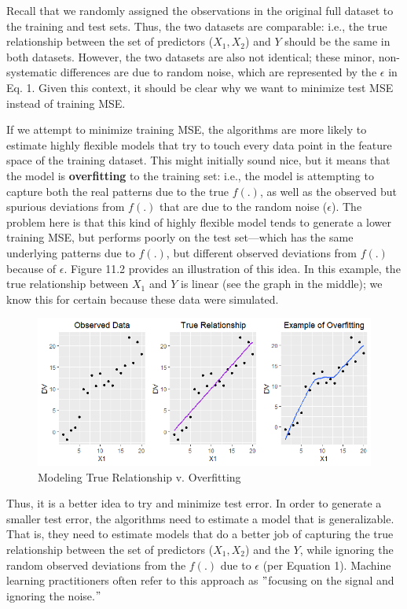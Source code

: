 \documentclass{book}
\begin{document}
Recall that we randomly assigned the observations in the original full dataset
to the training and test sets. Thus, the two datasets are comparable: i.e.,
the true relationship between the set of predictors (\(X_{1}, X_{2}\)) and
\(Y\) should be the same in both datasets. However, the two datasets are also
not identical; these minor, non-systematic differences are due to random
noise, which are represented by the \(\epsilon\) in Eq. 1. Given this context,
it should be clear why we want to minimize test MSE instead of training MSE.

If we attempt to minimize training MSE, the algorithms are more likely to
estimate highly flexible models that try to touch every data point in the
feature space of the training dataset. This might initially sound nice, but it
means that the model is \textbf{overfitting} to the training set: i.e., the
model is attempting to capture both the real patterns due to the true
\({f}(.)\), as well as the observed but spurious deviations from \({f}(.)\)
that are due to the random noise (\(\epsilon\)). The problem here is that this
kind of highly flexible model tends to generate a lower training MSE, but
performs poorly on the test set---which has the same underlying patterns due
to \({f}(.)\), but different observed deviations from \({f}(.)\) because of
\(\epsilon\). Figure 11.2 provides an illustration of this idea. In this
example, the true relationship between \(X_{1}\) and \(Y\) is linear (see the
graph in the middle); we know this for certain because these data were
simulated.

\begin{figure}
\centering
\includegraphics{images/ml/jl-figure2.png}
\caption{Modeling True Relationship v. Overfitting}
\end{figure}

Thus, it is a better idea to try and minimize test error. In order to generate
a smaller test error, the algorithms need to estimate a model that is
generalizable. That is, they need to estimate models that do a better job of
capturing the true relationship between the set of predictors
(\(X_{1},X_{2}\)) and the \(Y\), while ignoring the random observed deviations
from the \({f}(.)\) due to \(\epsilon\) (per Equation 1). Machine learning
practitioners often refer to this approach as \("\)focusing on the signal and
ignoring the noise.\("\)
\end{document}
